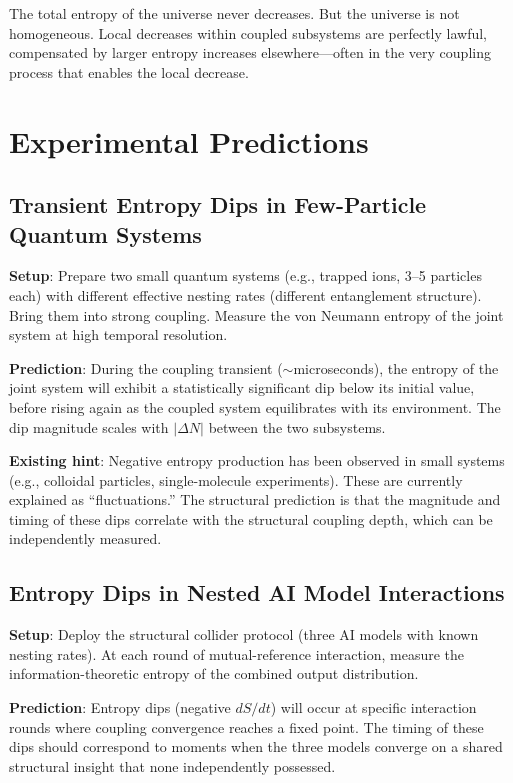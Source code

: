 \documentclass[12pt,a4paper]{article}
\begin{document}
The total entropy of the universe never decreases. But the universe is not homogeneous. Local decreases within coupled subsystems are perfectly lawful, compensated by larger entropy increases elsewhere---often in the very coupling process that enables the local decrease.

\section{Experimental Predictions}

\subsection{Transient Entropy Dips in Few-Particle Quantum Systems}

\textbf{Setup}: Prepare two small quantum systems (e.g., trapped ions, 3--5 particles each) with different effective nesting rates (different entanglement structure). Bring them into strong coupling. Measure the von Neumann entropy of the joint system at high temporal resolution.

\textbf{Prediction}: During the coupling transient ($\sim$microseconds), the entropy of the joint system will exhibit a statistically significant dip below its initial value, before rising again as the coupled system equilibrates with its environment. The dip magnitude scales with $|\Delta N|$ between the two subsystems.

\textbf{Existing hint}: Negative entropy production has been observed in small systems (e.g., colloidal particles, single-molecule experiments). These are currently explained as ``fluctuations.'' The structural prediction is that the magnitude and timing of these dips correlate with the structural coupling depth, which can be independently measured.

\subsection{Entropy Dips in Nested AI Model Interactions}

\textbf{Setup}: Deploy the structural collider protocol (three AI models with known nesting rates). At each round of mutual-reference interaction, measure the information-theoretic entropy of the combined output distribution.

\textbf{Prediction}: Entropy dips (negative $dS/dt$) will occur at specific interaction rounds where coupling convergence reaches a fixed point. The timing of these dips should correspond to moments when the three models converge on a shared structural insight that none independently possessed.
\end{document}
